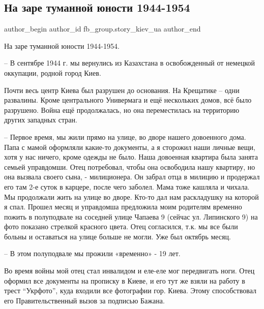  
 
 
 
 
 
\subsection{На заре туманной юности 1944-1954}
\label{sec:25_05_2021.fb.fb_group.story_kiev_ua.2.na_zare_tumannoj_junosti}
\ifcmt
 author_begin
   author_id fb_group.story_kiev_ua
 author_end
\fi

На заре туманной юности 1944-1954.

– В сентябре 1944 г. мы вернулись из Казахстана в освобожденный от немецкой оккупации,  родной город Киев.  

Почти весь центр Киева был разрушен до основания. На Крещатике – одни
развалины. Кроме центрального Универмага и ещё нескольких домов, всё было
разрушено. Война ещё продолжалась, но она переместилась на территорию других
западных стран. 

– Первое время, мы жили прямо на улице, во дворе нашего довоенного дома. Папа с
мамой оформляли какие-то документы, а я сторожил наши личные  вещи, хотя у нас
ничего, кроме одежды не было. Наша довоенная квартира была занята семьей
управдомши. Отец потребовал, чтобы она освободила нашу  квартиру, но она
вызвала своего сына, - милиционера. Он забрал отца в милицию и продержал его
там 2-е суток в карцере, после чего заболел. Мама тоже кашляла и чихала. Мы
продолжали жить на улице во дворе. Кто-то дал нам раскладушку на которой я
спал. Прошел месяц и  управдомша предложила моим родителям временно пожить в
полуподвале на соседней улице Чапаева 9  (сейчас ул. Липинского  9) на фото
показано стрелкой красного цвета. Отец согласился, т.к. мы все были больны и
оставаться на улице больше не могли.  Уже был октябрь месяц.

– В этом полуподвале мы прожили «временно» -  19 лет.

Во время войны мой отец стал инвалидом и еле-еле мог передвигать ноги. Отец
оформил все документы на прописку в Киеве, и его тут же взяли на работу в трест
“Укрфото”, куда входили все фотографии гор. Киева. Этому способствовал его
Правительственный вызов за подписью Бажана.

